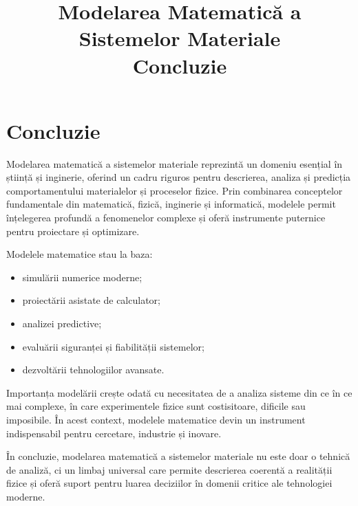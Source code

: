 \documentclass[12pt,a4paper]{article}
\title{Modelarea Matematică a Sistemelor Materiale \\ \large Concluzie}
\author{}
\date{}
\begin{document}
\maketitle

\section{Concluzie}

Modelarea matematică a sistemelor materiale reprezintă un domeniu esențial în știință și inginerie, oferind un cadru riguros pentru descrierea, analiza și predicția comportamentului materialelor și proceselor fizice. Prin combinarea conceptelor fundamentale din matematică, fizică, inginerie și informatică, modelele permit înțelegerea profundă a fenomenelor complexe și oferă instrumente puternice pentru proiectare și optimizare.

Modelele matematice stau la baza:
\begin{itemize}
    \item simulării numerice moderne;
    \item proiectării asistate de calculator;
    \item analizei predictive;
    \item evaluării siguranței și fiabilității sistemelor;
    \item dezvoltării tehnologiilor avansate.
\end{itemize}

Importanța modelării crește odată cu necesitatea de a analiza sisteme din ce în ce mai complexe, în care experimentele fizice sunt costisitoare, dificile sau imposibile. În acest context, modelele matematice devin un instrument indispensabil pentru cercetare, industrie și inovare.

În concluzie, modelarea matematică a sistemelor materiale nu este doar o tehnică de analiză, ci un limbaj universal care permite descrierea coerentă a realității fizice și oferă suport pentru luarea deciziilor în domenii critice ale tehnologiei moderne.
\end{document}
